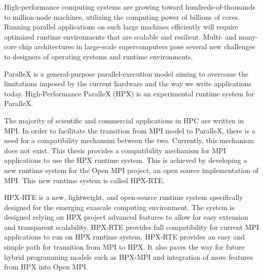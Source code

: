 High-performance computing systems are growing toward hundreds-of-thousands to million-node machines, utilizing the computing power of billions of cores. Running parallel applications on such large machines efficiently will require optimized runtime environments that are scalable and resilient. Multi- and many-core chip architectures in large-scale supercomputers pose several new challenges to designers of operating systems and runtime environments.

ParalleX is a general-purpose parallel-execution model aiming to overcome the limitations imposed by the current hardware and the way we write applications today. High-Performance ParalleX (HPX) is an experimental runtime system for ParalleX.

The majority of scientific and commercial applications in HPC are written in MPI. In order to facilitate the transition from MPI model to ParalleX, there is a need for a compatibility mechansim between the two. Currently, this mechanism does not exist. This thesis provides a compatibility mechanism for MPI applications to use the HPX runtime system. This is achieved by developing a new runtime system for the Open MPI project, an open source implementation of MPI. This new runtime system is called HPX-RTE.

HPX-RTE is a new, lightweight, and open-source runtime system specifically designed for the emerging exascale computing environment. The system is designed relying on HPX project advanced features to allow for easy extension and transparent scalability. HPX-RTE provides full compatibility for current MPI applications to run on HPX runtime system. HPX-RTE provides an easy and simple path for transition from MPI to HPX. It also paves the way for future hybrid programming models such as HPX-MPI and integration of more features from HPX into Open MPI.
